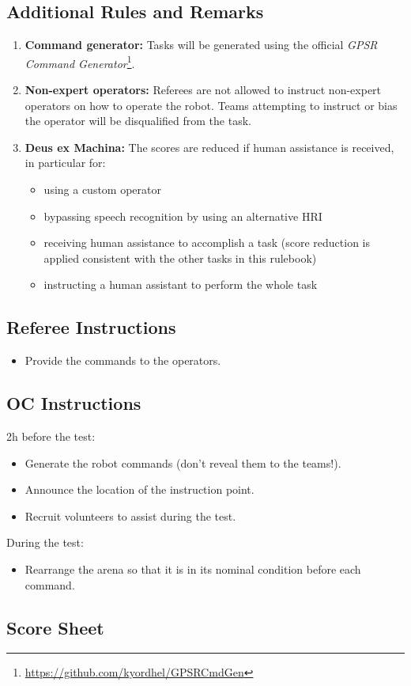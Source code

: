 \subsection*{Additional Rules and Remarks}
\begin{enumerate}[nosep]
	\item \textbf{Command generator:} Tasks will be generated using the official \emph{GPSR Command Generator}\footnote{\url{https://github.com/kyordhel/GPSRCmdGen}}.

	\item \textbf{Non-expert operators:} Referees are not allowed to instruct non-expert operators on how to operate the robot.
	Teams attempting to instruct or bias the operator will be disqualified from the task.

	\item \textbf{Deus ex Machina:} The scores are reduced if human assistance is received, in particular for:
	\begin{itemize}
		\item using a custom operator
		\item bypassing speech recognition by using an alternative HRI
		\item receiving human assistance to accomplish a task (score reduction is applied consistent with the other tasks in this rulebook)
		\item instructing a human assistant to perform the whole task
	\end{itemize}
\end{enumerate}

\subsection*{Referee Instructions}
\begin{itemize}[nosep]
	\item Provide the commands to the operators.
\end{itemize}

\subsection*{OC Instructions}

2h before the test:
\begin{itemize}[nosep]
	\item Generate the robot commands (don't reveal them to the teams!).
	\item Announce the location of the instruction point.
	\item Recruit volunteers to assist during the test.
	\newline
\end{itemize}

\noindent During the test:
\begin{itemize}[nosep]
	\item Rearrange the arena so that it is in its nominal condition before each command.
\end{itemize}

\subsection*{Score Sheet}


